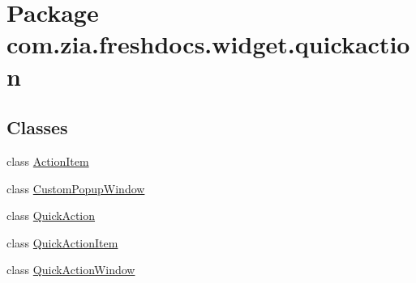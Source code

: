 \hypertarget{namespacecom_1_1zia_1_1freshdocs_1_1widget_1_1quickaction}{\section{Package com.\-zia.\-freshdocs.\-widget.\-quickaction}
\label{namespacecom_1_1zia_1_1freshdocs_1_1widget_1_1quickaction}
}
\subsection*{Classes}
\begin{DoxyCompactItemize}
\item 
class \hyperlink{classcom_1_1zia_1_1freshdocs_1_1widget_1_1quickaction_1_1_action_item}{Action\-Item}
\item 
class \hyperlink{classcom_1_1zia_1_1freshdocs_1_1widget_1_1quickaction_1_1_custom_popup_window}{Custom\-Popup\-Window}
\item 
class \hyperlink{classcom_1_1zia_1_1freshdocs_1_1widget_1_1quickaction_1_1_quick_action}{Quick\-Action}
\item 
class \hyperlink{classcom_1_1zia_1_1freshdocs_1_1widget_1_1quickaction_1_1_quick_action_item}{Quick\-Action\-Item}
\item 
class \hyperlink{classcom_1_1zia_1_1freshdocs_1_1widget_1_1quickaction_1_1_quick_action_window}{Quick\-Action\-Window}
\end{DoxyCompactItemize}
